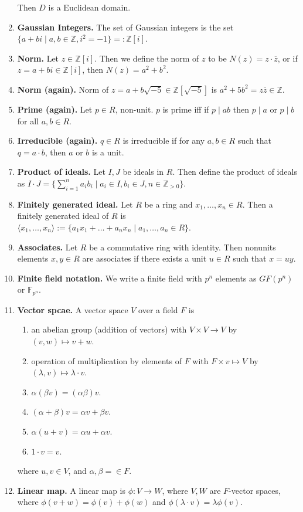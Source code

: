 \begin{enumerate}
	Then $D$ is a Euclidean domain. 
	\item \textbf{Gaussian Integers. } The set of Gaussian integers is the set $\{a + bi \mid a,b \in \mathbb{Z}, i^2 = -1\} =: \mathbb{Z}[i]$. 
	\item \textbf{Norm. } Let $z \in \mathbb{Z}[i]$. Then we define the norm of $z$ to be $N(z)=z \cdot \overline{z}$, or if $z=a+bi \in \mathbb{Z}[i]$, then $N(z) = a^2 + b^2$. 
	\item \textbf{Norm (again). } Norm of $z = a+b\sqrt{-5} \in \mathbb{Z}[\sqrt{-5}]$ is $a^2 + 5b^2 = z\overline{z} \in \mathbb{Z}$. 
	\item \textbf{Prime (again). } Let $p \in R$, non-unit. $p$ is prime iff if $p \mid ab$ then $p \mid a $ or $p \mid b$ for all $a,b \in R$. 
	\item \textbf{Irreducible (again). } $q \in R$ is irreducible if for any $a,b \in R$ such that $q = a \cdot b$, then $a$ or $b$ is a unit. 
	\item \textbf{Product of ideals. } Let $I,J$ be ideals in $R$. Then define the product of ideals as $I \cdot J = \{\sum_{i=1}^{n} a_ib_i \mid a_i \in I, b_i \in J, n \in \mathbb{Z}_{>0}\}$. 
	\item \textbf{Finitely generated ideal. } Let $R$ be a ring and $x_1,\dots,x_n \in R$. Then a finitely generated ideal of $R$ is $\langle x_1,\dots,x_n \rangle := \{a_1x_1 + \dots + a_nx_n \mid a_1,\dots,a_n \in R\}$. 
	\item \textbf{Associates. } Let $R$ be a commutative ring with identity. Then nonunits elements $x,y \in R$ are associates if there exists a unit $u \in R$ such that $x=uy$. 
	\item \textbf{Finite field notation. } We write a finite field with $p^n$ elements as $GF(p^n)$ or $\mathbb{F}_{p^n}$. 
	\item \textbf{Vector spcae. } A vector space $V$ over a field $F$ is 
	\begin{enumerate}
		\item an abelian group (addition of vectors) with $V \times V \to V$ by $(v,w) \mapsto v+w$. 
		\item operation of multiplication by elements of $F$ with $F \times v \mapsto V$ by $(\lambda,v) \mapsto \lambda \cdot v$. 
		\item $\alpha(\beta v) = (\alpha\beta)v$. 
		\item $(\alpha + \beta)v = \alpha v + \beta v$. 
		\item $\alpha(u+v) = \alpha u + \alpha v$. 
		\item $1 \cdot v = v$. 
	\end{enumerate}
	where $u,v \in V$, and $\alpha,\beta = \in F$. 
	\item \textbf{Linear map. } A linear map is $\phi: V \to W$, where $V,W$ are $F$-vector spaces, where $\phi(v+w) = \phi(v) + \phi(w)$ and $\phi(\lambda \cdot v) = \lambda\phi(v)$. 
\end{enumerate}



